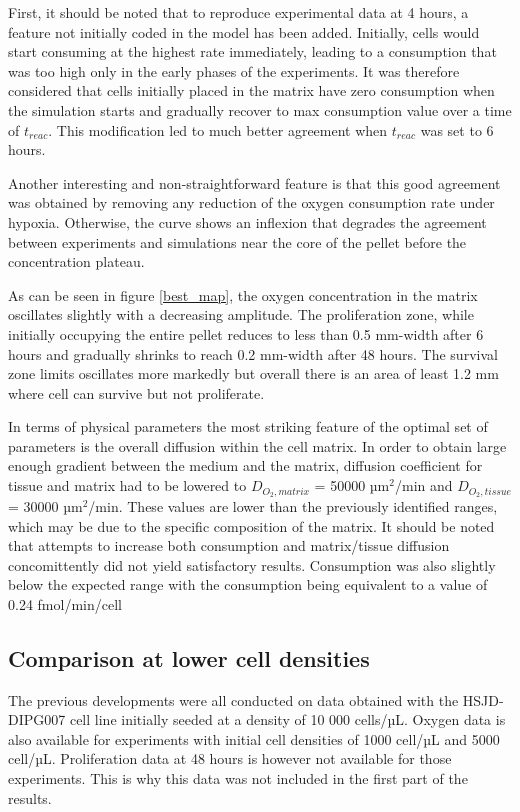 \documentclass[11pt,a4paper]{article}
\begin{document}
First, it should be noted that to reproduce experimental data at 4 hours, a feature not initially coded in the model has been added. Initially, cells would start consuming at the highest rate immediately, leading to a consumption that was too high only in the early phases of the experiments. It was therefore considered that cells initially placed in the matrix have zero consumption  when the simulation starts and gradually recover to max consumption value over a time of $t_{reac}$. This modification led to much better agreement when $t_{reac}$ was set to 6 hours.

Another interesting and non-straightforward feature is that this good agreement was obtained by removing any reduction of the oxygen consumption rate under hypoxia. Otherwise, the curve shows an inflexion that degrades the agreement between experiments and simulations near the core of the pellet before the concentration plateau.

As can be seen in figure \ref{best_map}, the oxygen concentration in the matrix oscillates slightly with a decreasing amplitude. The proliferation zone, while initially occupying the entire pellet reduces to less than 0.5 mm-width after 6 hours and gradually shrinks to reach 0.2 mm-width after 48 hours. The survival zone limits oscillates more markedly but overall there is an area of least 1.2 mm where cell can survive but not proliferate.

In terms of physical parameters the most striking feature of the optimal set of parameters is the overall diffusion within the cell matrix. In order to obtain large enough gradient between the medium and the matrix, diffusion coefficient for tissue and matrix had to be lowered to  $D_{O_2,matrix}$  = 50000 µm$^2$/min and $D_{O_2,tissue}$ = 30000 µm$^2$/min. These values are lower than the previously identified ranges, which may be due to the specific composition of the matrix. It should be noted that attempts to increase both consumption and matrix/tissue diffusion concomittently did not yield satisfactory results. Consumption was also slightly below the expected range with the consumption being equivalent to a value of 0.24 fmol/min/cell 

\subsection{Comparison at lower cell densities}
The previous developments were all conducted on data obtained with the HSJD-DIPG007 cell line initially seeded at a density of 10 000 cells/µL. Oxygen data is also available for experiments with initial cell densities of 1000 cell/µL and 5000 cell/µL. Proliferation data at 48 hours is however not available for those experiments. This is why this data was not included in the first part of the results. 
\end{document}
